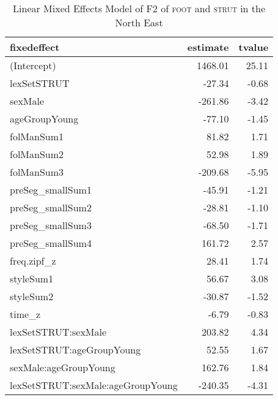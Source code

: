 \begin{table}[ht]
\centering
\begin{tabular}{lrr}
  \hline
fixedeffect & estimate & tvalue \\ 
  \hline
(Intercept) & 1468.01 & 25.11 \\ 
  lexSetSTRUT & -27.34 & -0.68 \\ 
  sexMale & -261.86 & -3.42 \\ 
  ageGroupYoung & -77.10 & -1.45 \\ 
  folManSum1 & 81.82 & 1.71 \\ 
  folManSum2 & 52.98 & 1.89 \\ 
  folManSum3 & -209.68 & -5.95 \\ 
  preSeg\_smallSum1 & -45.91 & -1.21 \\ 
  preSeg\_smallSum2 & -28.81 & -1.10 \\ 
  preSeg\_smallSum3 & -68.50 & -1.71 \\ 
  preSeg\_smallSum4 & 161.72 & 2.57 \\ 
  freq.zipf\_z & 28.41 & 1.74 \\ 
  styleSum1 & 56.67 & 3.08 \\ 
  styleSum2 & -30.87 & -1.52 \\ 
  time\_z & -6.79 & -0.83 \\ 
  lexSetSTRUT:sexMale & 203.82 & 4.34 \\ 
  lexSetSTRUT:ageGroupYoung & 52.55 & 1.67 \\ 
  sexMale:ageGroupYoung & 162.76 & 1.84 \\ 
  lexSetSTRUT:sexMale:ageGroupYoung & -240.35 & -4.31 \\ 
   \hline
\end{tabular}
\caption{Linear Mixed Effects Model of F2 of \textsc{foot} and \textsc{strut} in the North East \label{tbl:FSF2NE}} 
\end{table}
